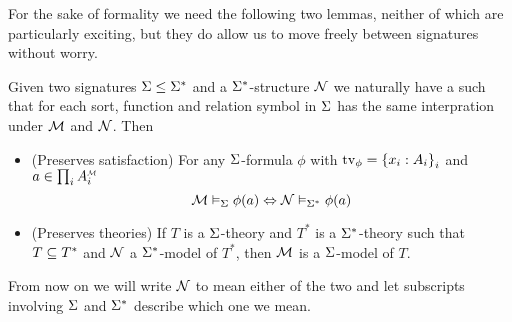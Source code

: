 For the sake of formality we need the following two lemmas, 
neither of which are particularly exciting,
but they do allow us to move freely between signatures without worry.
\begin{lem}
    Given two signatures
    $\Sigma \leq \Sigma^*$ and
    a $\Sigma^*$-structure $\mathcal{N}$ we naturally have
    a  such that
    for each sort, function and relation symbol in $\Sigma$ has the 
    same interpration under $\mathcal{M}$ and $\mathcal{N}$.
    Then 
    \begin{itemize}
        \item (Preserves satisfaction) For any $\Sigma$-formula $\phi$ 
            with $\textrm{tv}_{\phi} = \left\{x_i : A_i\right\}_i$ and 
            $a \in \prod_i \mmintp{A_i}$
            \[\mathcal{M} \vDash_{\Sigma} \phi(a) \Leftrightarrow \mathcal{N} \vDash_{\Sigma^*} \phi(a)\]
        \item (Preserves theories) 
            If $T$ is a $\Sigma$-theory and $T^*$ is a $\Sigma^*$-theory 
            such that $T \subseteq T^*$ and $\mathcal{N}$ a $\Sigma^*$-model of $T^*$,
            then $\mathcal{M}$ is a $\Sigma$-model of $T$.
    \end{itemize}
    From now on we will write 
    $\mathcal{N}$ to mean either of the two and let subscripts involving 
    $\Sigma$ and $\Sigma^*$ describe which one we mean.
\end{lem}
